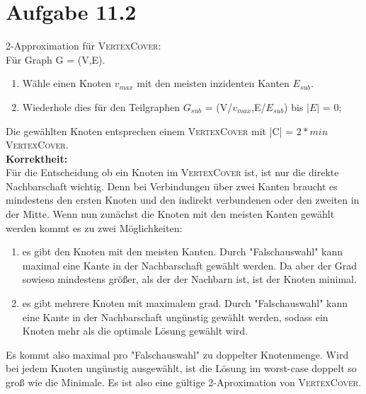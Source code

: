 \documentclass{article}
\begin{document}
\section{Aufgabe 11.2}
2-Approximation für \textsc{VertexCover}:\\
Für Graph G = (V,E).
\begin{enumerate}
	\item Wähle einen Knoten $v_{max}$ mit den meisten inzidenten Kanten $E_{sub}$.
	\item Wiederhole dies für den Teilgraphen $G_{sub}$ = (V/$v_{max}$,E/$E_{sub}$) bis $|E|$ = 0;
\end{enumerate}
Die gewählten Knoten entsprechen einem \textsc{VertexCover} mit |C| = $2*min$\textsc{VertexCover}. \\
\textbf{Korrektheit:}\\
Für die Entscheidung ob ein Knoten im \textsc{VertexCover} ist, ist nur die direkte Nachbarschaft wichtig. Denn bei Verbindungen über zwei Kanten braucht es mindestens den ersten Knoten und den indirekt verbundenen oder den zweiten in der Mitte. Wenn nun zunächst die Knoten mit den meisten Kanten gewählt werden kommt es zu zwei Möglichkeiten:\
\begin{enumerate}
	\item es gibt den Knoten mit den meisten Kanten. Durch "Falschauswahl" kann maximal eine Kante in der Nachbarschaft gewählt werden. Da aber der Grad sowieso mindestens größer, als der der Nachbarn ist, ist der Knoten minimal.
	\item es gibt mehrere Knoten mit maximalem grad. Durch "Falschauswahl" kann eine Kante in der Nachbarschaft ungünstig gewählt werden, sodass ein Knoten mehr als die optimale Lösung gewählt wird.
\end{enumerate}
Es kommt also maximal pro "Falschauswahl" zu doppelter Knotenmenge. Wird bei jedem Knoten ungünstig ausgewählt, ist die Lösung im worst-case doppelt so groß wie die Minimale. Es ist also eine gültige 2-Aproximation von \textsc{VertexCover}.
\end{document}
